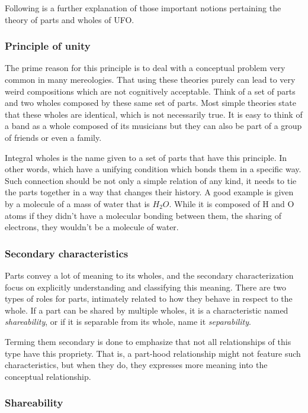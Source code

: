 Following is a further explanation of those important notions pertaining the theory of parts and wholes of UFO.

\subsubsection{Principle of unity}

The prime reason for this principle is to deal with a conceptual problem very common in many mereologies. That using these theories purely can lead to very weird compositions which are not cognitively acceptable. Think of a set of parts and two wholes composed by these same set of parts. Most simple theories state that these wholes are identical, which is not necessarily true. It is easy to think of a band as a whole composed of its musicians but they can also be part of a group of friends or even a family. 

Integral wholes is the name given to a set of parts that have this principle. In other words, which have a unifying condition which bonds them in a specific way. Such connection should be not only a simple relation of any kind, it needs to tie the parts together in a way that changes their history. A good example is given by a molecule of a mass of water that is $H_2O$. While it is composed of H and O atoms if they didn't have a molecular bonding between them, the sharing of electrons, they wouldn't be a molecule of water.

\subsubsection{Secondary characteristics}

Parts convey a lot of meaning to its wholes, and the secondary characterization focus on explicitly understanding and classifying this meaning. There are two types of roles for parts, intimately related to how they behave in respect to the whole. If a part can be shared by multiple wholes, it is a characteristic named \textit{shareability}, or if it is separable from its whole, name it \textit{separability}.

Terming them secondary is done to emphasize that not all relationships of this type have this propriety. That is, a part-hood relationship might not feature such characteristics, but when they do, they expresses more meaning into the conceptual relationship.

\subsubsection{Shareability}

